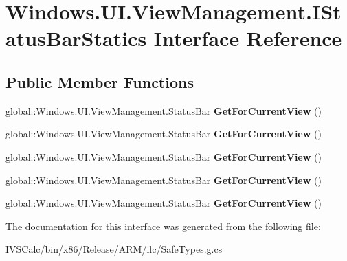 \hypertarget{interface_windows_1_1_u_i_1_1_view_management_1_1_i_status_bar_statics}{}\section{Windows.\+U\+I.\+View\+Management.\+I\+Status\+Bar\+Statics Interface Reference}
\label{interface_windows_1_1_u_i_1_1_view_management_1_1_i_status_bar_statics}
\subsection*{Public Member Functions}
\begin{DoxyCompactItemize}
\item 
\mbox{\label{interface_windows_1_1_u_i_1_1_view_management_1_1_i_status_bar_statics_afe8f12de893060997098c7fde9fe069d}} 
global\+::\+Windows.\+U\+I.\+View\+Management.\+Status\+Bar {\bfseries Get\+For\+Current\+View} ()
\item 
\mbox{\label{interface_windows_1_1_u_i_1_1_view_management_1_1_i_status_bar_statics_afe8f12de893060997098c7fde9fe069d}} 
global\+::\+Windows.\+U\+I.\+View\+Management.\+Status\+Bar {\bfseries Get\+For\+Current\+View} ()
\item 
\mbox{\label{interface_windows_1_1_u_i_1_1_view_management_1_1_i_status_bar_statics_afe8f12de893060997098c7fde9fe069d}} 
global\+::\+Windows.\+U\+I.\+View\+Management.\+Status\+Bar {\bfseries Get\+For\+Current\+View} ()
\item 
\mbox{\label{interface_windows_1_1_u_i_1_1_view_management_1_1_i_status_bar_statics_afe8f12de893060997098c7fde9fe069d}} 
global\+::\+Windows.\+U\+I.\+View\+Management.\+Status\+Bar {\bfseries Get\+For\+Current\+View} ()
\item 
\mbox{\label{interface_windows_1_1_u_i_1_1_view_management_1_1_i_status_bar_statics_afe8f12de893060997098c7fde9fe069d}} 
global\+::\+Windows.\+U\+I.\+View\+Management.\+Status\+Bar {\bfseries Get\+For\+Current\+View} ()
\end{DoxyCompactItemize}


The documentation for this interface was generated from the following file\+:\begin{DoxyCompactItemize}
\item 
I\+V\+S\+Calc/bin/x86/\+Release/\+A\+R\+M/ilc/Safe\+Types.\+g.\+cs\end{DoxyCompactItemize}

